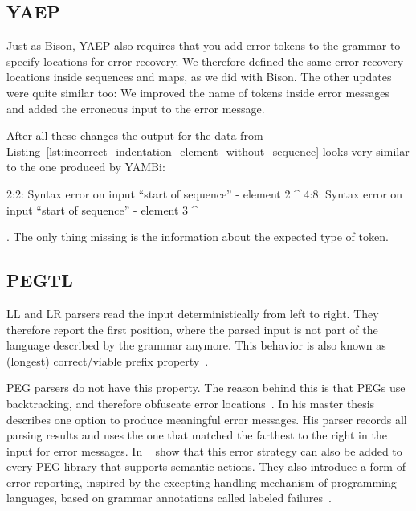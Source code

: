 \subsection{YAEP}

Just as Bison, YAEP also requires that you add error tokens to the grammar to specify locations for error recovery. We therefore defined the same error recovery locations inside sequences and maps, as we did with Bison. The other updates were quite similar too: We improved the name of tokens inside error messages and added the erroneous input to the error message.

After all these changes the output for the  data from Listing~\ref{lst:incorrect_indentation_element_without_sequence} looks very similar to the one produced by YAMBi:

\begin{textcode}
2:2: Syntax error on input “start of sequence”
      - element 2
      ^
4:8: Syntax error on input “start of sequence”
            - element 3
            ^
\end{textcode}

. The only thing missing is the information about the expected type of token.

\subsection{PEGTL}

LL and LR parsers read the input deterministically from left to right. They therefore report the first position, where the parsed input is not part of the language described by the grammar anymore. This behavior is also known as (longest) correct/viable prefix property~\cite{sippu1990parsing, ruefenacht2016error, maidl2016129, pottier2016reachability}.

\Gls{PEG} parsers do not have this property. The reason behind this is that \glspl{PEG} use backtracking, and therefore obfuscate error locations~\cite{ruefenacht2016error}. In his master thesis~\cite{ford2002packrat} \citeauthor{ford2002packrat} describes one option to produce meaningful error messages. His parser records all parsing results and uses the one that matched the farthest to the right in the input for error messages. In ~\cite{maidl2016129} \citeauthor{maidl2016129} show that this error strategy can also be added to every \gls{PEG} library that supports semantic actions. They also introduce a form of error reporting, inspired by the excepting handling mechanism of programming languages, based on grammar annotations called labeled failures~\cite{maidl2016129}.


